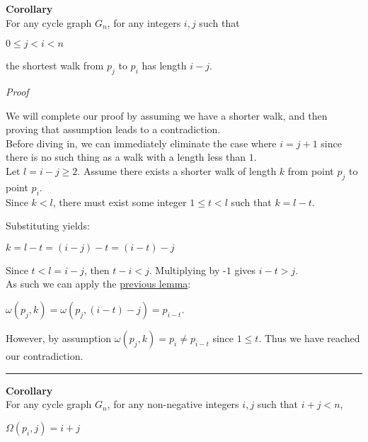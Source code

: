 \documentclass[a4paper,12pt]{article}
\begin{document}
\label{corollary:shortest_walk_1}
\hypertarget{corollary:shortest_walk_1}{}
\begin{tcolorbox}
\textbf{Corollary}\\
For any cycle graph $G_n$, for any integers $i, j$ such that

\begin{center}
$0 \leq j < i < n$
\end{center}

\noindent the shortest walk from $p_j$ to $p_i$ has length $i - j$.
\end{tcolorbox}

\noindent
\textit{Proof}

\noindent We will complete our proof by assuming we have a shorter walk, and then proving that assumption leads to a contradiction.\\

\noindent Before diving in, we can immediately eliminate the case where $i = j + 1$ since there is no such thing as a walk with a length less than $1$.\\

\noindent Let $l = i - j \geq 2$. Assume there exists a shorter walk of length $k$ from point $p_j$ to point $p_i$.\\

\noindent Since $k < l$, there must exist some integer $1 \leq t < l$ such that $k = l - t$.

\noindent Substituting yields:
\begin{center}
$k = l - t = (i - j) - t = (i - t) - j$
\end{center}

\noindent Since $t < l = i - j$, then $t - i < j$. Multiplying by -$1$ gives $i - t > j$.\\

\noindent As such we can apply the \hyperlink{lemma:existence_of_walk_1}{previous lemma}:
\begin{center}
$\omega(p_j, k) = \omega(p_j, (i - t) - j) = p_{i - t}$.
\end{center}

\noindent However, by assumption $\omega(p_j, k) = p_i \neq p_{i - t}$ since $1 \leq t$. Thus we have reached our contradiction.

\begin{center}
\noindent\rule{8cm}{0.4pt}
\end{center}




\label{corollary:Omega_result_1}
\hypertarget{corollary:Omega_result_1}{}
\begin{tcolorbox}
\textbf{Corollary}\\
For any cycle graph $G_n$, for any non-negative integers $i, j$ such that $i + j < n$,
\begin{center}
$\Omega(p_i, j) = i + j$
\end{center}
\end{tcolorbox}
\end{document}
